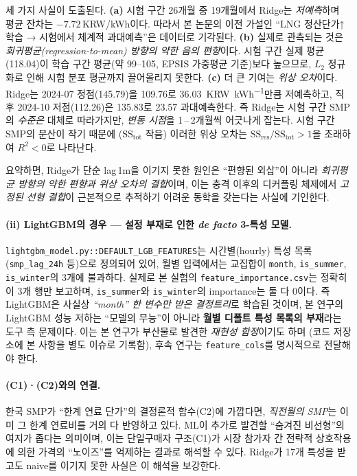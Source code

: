 \documentclass[11pt,a4paper]{article}
\begin{document}
세 가지 사실이 도출된다.
\textbf{(a)} 시험 구간 26개월 중 19개월에서 Ridge는 \emph{저예측}하며
평균 잔차는 $-7.72$\,KRW/kWh이다. 따라서 본 논문의 이전 가설인
``LNG 정산단가↑ 학습 → 시험에서 체계적 과대예측''은 데이터로 기각된다.
\textbf{(b)} 실제로 관측되는 것은 \emph{회귀평균(regression-to-mean)
방향의 약한 음의 편향}이다. 시험 구간 실제 평균(118.04)이 학습 구간
평균(약 \SI{99}{}--\SI{105}{}, EPSIS 가중평균 기준)보다 높으므로,
$L_2$ 정규화로 인해 시험 분포 평균까지 끌어올리지 못한다.
\textbf{(c)} 더 큰 기여는 \emph{위상 오차}이다. Ridge는
2024-07 정점(\SI{145.79}{})을 \SI{109.76}{}로 \SI{36.03}{KRW\per kWh}만큼
저예측하고, 직후 2024-10 저점(\SI{112.26}{})은 \SI{135.83}{}로
\SI{23.57}{} 과대예측한다. 즉 Ridge는 시험 구간 SMP의 \emph{수준은}
대체로 따라가지만, \emph{변동 시점}을 1\,--\,2개월씩 어긋나게 잡는다.
시험 구간 SMP의 분산이 작기 때문에 ($\mathrm{SS}_{\mathrm{tot}}$ 작음)
이러한 위상 오차는 $\mathrm{SS}_{\mathrm{res}}/\mathrm{SS}_{\mathrm{tot}}>1$을
초래하여 $R^2<0$로 나타난다.

요약하면, Ridge가 단순 lag\,1m을 이기지 못한 원인은
``편향된 외삽''이 아니라 \emph{회귀평균 방향의 약한 편향과 위상 오차의
결합}이며, 이는 충격 이후의 디커플링 체제에서 \emph{고정된 선형 결합}이
근본적으로 추적하기 어려운 동학을 갖는다는 사실에 기인한다.

\paragraph{(ii) LightGBM의 경우 --- 설정 부재로 인한 \textit{de facto}
3-특성 모델.} \texttt{lightgbm\_model.py::DEFAULT\_LGB\_FEATURES}는
시간별(hourly) 특성 목록(\texttt{smp\_lag\_24h} 등)으로 정의되어 있어,
월별 입력에서는 교집합이 \texttt{month}, \texttt{is\_summer},
\texttt{is\_winter}의 3개에 불과하다. 실제로 본 실험의
\texttt{feature\_importance.csv}는 정확히 이 3개 행만 보고하며,
\texttt{is\_summer}와 \texttt{is\_winter}의 importance는 둘 다 0이다.
즉 LightGBM은 사실상 \emph{``month'' 한 변수만 받은 결정트리}로
학습된 것이며, 본 연구의 LightGBM 성능 저하는 ``모델의 무능''이
아니라 \textbf{월별 디폴트 특성 목록의 부재}라는 도구 측 문제이다.
이는 본 연구가 부산물로 발견한 \textit{재현성 함정}이기도 하며
(코드 저장소에 본 사항을 별도 이슈로 기록함), 후속 연구는
\texttt{feature\_cols}를 명시적으로 전달해야 한다.

\paragraph{(C1)·(C2)와의 연결.}
한국 SMP가 ``한계 연료 단가''의 결정론적 함수(C2)에 가깝다면,
\emph{직전월의 SMP}는 이미 그 한계 연료비를 거의 다 반영하고 있다.
ML이 추가로 발견할 ``숨겨진 비선형''의 여지가 좁다는 의미이며,
이는 단일구매자 구조(C1)가 시장 참가자 간 전략적 상호작용에 의한
가격의 ``노이즈''를 억제하는 결과로 해석할 수 있다. Ridge가
17개 특성을 받고도 naive를 이기지 못한 사실은 이 해석을 보강한다.
\end{document}
